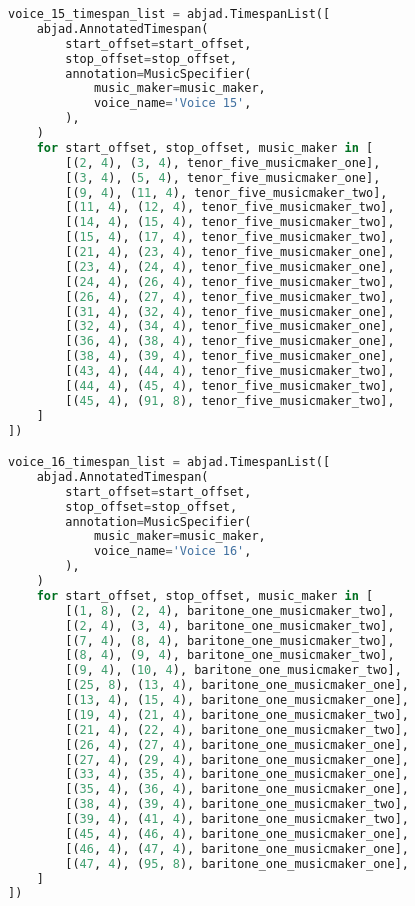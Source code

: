 \begin{lstlisting}[language=Python, caption=Invocation Source Code]
voice_15_timespan_list = abjad.TimespanList([
    abjad.AnnotatedTimespan(
        start_offset=start_offset,
        stop_offset=stop_offset,
        annotation=MusicSpecifier(
            music_maker=music_maker,
            voice_name='Voice 15',
        ),
    )
    for start_offset, stop_offset, music_maker in [
        [(2, 4), (3, 4), tenor_five_musicmaker_one],
        [(3, 4), (5, 4), tenor_five_musicmaker_one],
        [(9, 4), (11, 4), tenor_five_musicmaker_two],
        [(11, 4), (12, 4), tenor_five_musicmaker_two],
        [(14, 4), (15, 4), tenor_five_musicmaker_two],
        [(15, 4), (17, 4), tenor_five_musicmaker_two],
        [(21, 4), (23, 4), tenor_five_musicmaker_one],
        [(23, 4), (24, 4), tenor_five_musicmaker_one],
        [(24, 4), (26, 4), tenor_five_musicmaker_two],
        [(26, 4), (27, 4), tenor_five_musicmaker_two],
        [(31, 4), (32, 4), tenor_five_musicmaker_one],
        [(32, 4), (34, 4), tenor_five_musicmaker_one],
        [(36, 4), (38, 4), tenor_five_musicmaker_one],
        [(38, 4), (39, 4), tenor_five_musicmaker_one],
        [(43, 4), (44, 4), tenor_five_musicmaker_two],
        [(44, 4), (45, 4), tenor_five_musicmaker_two],
        [(45, 4), (91, 8), tenor_five_musicmaker_two],
    ]
])

voice_16_timespan_list = abjad.TimespanList([
    abjad.AnnotatedTimespan(
        start_offset=start_offset,
        stop_offset=stop_offset,
        annotation=MusicSpecifier(
            music_maker=music_maker,
            voice_name='Voice 16',
        ),
    )
    for start_offset, stop_offset, music_maker in [
        [(1, 8), (2, 4), baritone_one_musicmaker_two],
        [(2, 4), (3, 4), baritone_one_musicmaker_two],
        [(7, 4), (8, 4), baritone_one_musicmaker_two],
        [(8, 4), (9, 4), baritone_one_musicmaker_two],
        [(9, 4), (10, 4), baritone_one_musicmaker_two],
        [(25, 8), (13, 4), baritone_one_musicmaker_one],
        [(13, 4), (15, 4), baritone_one_musicmaker_one],
        [(19, 4), (21, 4), baritone_one_musicmaker_two],
        [(21, 4), (22, 4), baritone_one_musicmaker_two],
        [(26, 4), (27, 4), baritone_one_musicmaker_one],
        [(27, 4), (29, 4), baritone_one_musicmaker_one],
        [(33, 4), (35, 4), baritone_one_musicmaker_one],
        [(35, 4), (36, 4), baritone_one_musicmaker_one],
        [(38, 4), (39, 4), baritone_one_musicmaker_two],
        [(39, 4), (41, 4), baritone_one_musicmaker_two],
        [(45, 4), (46, 4), baritone_one_musicmaker_one],
        [(46, 4), (47, 4), baritone_one_musicmaker_one],
        [(47, 4), (95, 8), baritone_one_musicmaker_one],
    ]
])


\end{lstlisting}
